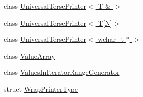 \begin{DoxyCompactItemize}
\item 
class \hyperlink{classtesting_1_1internal_1_1UniversalTersePrinter_3_01T_01_6_01_4}{Universal\+Terse\+Printer$<$ T \& $>$}
\item 
class \hyperlink{classtesting_1_1internal_1_1UniversalTersePrinter_3_01T[N]_4}{Universal\+Terse\+Printer$<$ T\mbox{[}\+N\mbox{]}$>$}
\item 
class \hyperlink{classtesting_1_1internal_1_1UniversalTersePrinter_3_01wchar__t_01_5_01_4}{Universal\+Terse\+Printer$<$ wchar\+\_\+t $\ast$ $>$}
\item 
class \hyperlink{classtesting_1_1internal_1_1ValueArray}{Value\+Array}
\item 
class \hyperlink{classtesting_1_1internal_1_1ValuesInIteratorRangeGenerator}{Values\+In\+Iterator\+Range\+Generator}
\item 
struct \hyperlink{structtesting_1_1internal_1_1WrapPrinterType}{Wrap\+Printer\+Type}
\end{DoxyCompactItemize}

